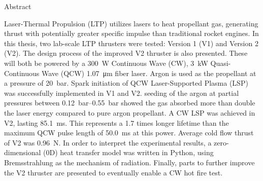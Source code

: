 \begin{plainchp}{Abstract}
    
    Laser-Thermal Propulsion (LTP) utilizes lasers to heat propellant gas, generating thrust with potentially greater specific impulse than traditional rocket engines. In this thesis, two lab-scale LTP thrusters were tested: Version 1 (V1) and Version 2 (V2). The design process of the improved V2 thruster is also presented. These will both be powered by a \qty{300}{W} Continuous Wave (CW), \qty{3}{kW} Quasi-Continuous Wave (QCW) \qty{1.07}{μm} fiber laser. Argon is used as the propellant at a pressure of \qty{20}{bar}. Spark initiation of QCW Laser-Supported Plasma (LSP) was successfully implemented in V1 and V2.  seeding of the argon at partial pressures between \qtyrange{.12}{.55}{bar} showed the gas absorbed more than double the laser energy compared to pure argon propellant. A CW LSP was achieved in V2, lasting \qty{85.1}{ms}. This represents a 1.7 times longer lifetime than the maximum QCW pulse length of \qty{50.0}{ms} at this power. Average cold flow thrust of V2 was \qty{0.96}{N}. In order to interpret the experimental results, a zero-dimensional (0D) heat transfer model was written in Python, using Bremsstrahlung as the mechanism of radiation. Finally, parts to further improve the V2 thruster are presented to eventually enable a CW hot fire test.

\end{plainchp}